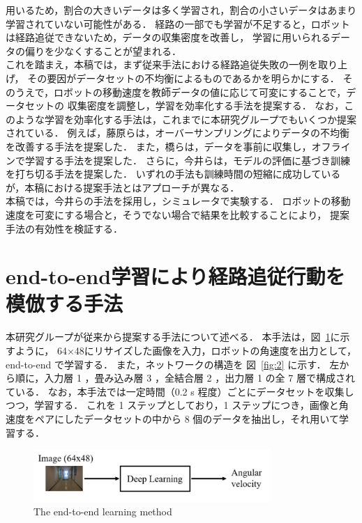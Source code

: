 \documentclass{jarticle}
\renewcommand{\figurename}{図~}
\newcommand{\figref}[1]{\figurename\ref{#1}}
\begin{document}
用いるため，割合の大きいデータは多く学習され，割合の小さいデータはあまり学習されていない可能性がある．
経路の一部でも学習が不足すると，ロボットは経路追従できないため，データの収集密度を改善し，
学習に用いられるデータの偏りを少なくすることが望まれる．\\
\hspace*{1zw}これを踏まえ，本稿では，まず従来手法における経路追従失敗の一例を取り上げ，
その要因がデータセットの不均衡によるものであるかを明らかにする．
そのうえで，ロボットの移動速度を教師データの値に応じて可変にすることで，データセットの
収集密度を調整し，学習を効率化する手法を提案する．
なお，このような学習を効率化する手法は，これまでに本研究グループでもいくつか提案されている．
例えば，藤原らは，オーバーサンプリングによりデータの不均衡を改善する手法を提案した\cite{fuji}．
また，橋らは，データを事前に収集し，オフラインで学習する手法を提案した\cite{takahashi}．
さらに，今井らは，モデルの評価に基づき訓練を打ち切る手法を提案した\cite{imai2}．
いずれの手法も訓練時間の短縮に成功しているが，本稿における提案手法とはアプローチが異なる．\\
\hspace*{1zw}本稿では，今井らの手法を採用し，シミュレータで実験する．
ロボットの移動速度を可変にする場合と，そうでない場合で結果を比較することにより，
提案手法の有効性を検証する．\\


\section{end-to-end学習により経路追従行動を模倣する手法}
本研究グループが従来から提案する手法について述べる．
本手法は，\figref{fig:1}に示すように，
64×48にリサイズした画像を入力，ロボットの角速度を出力として， end-to-end で学習する．
また，ネットワークの構造を \figref{fig:2} に示す．
左から順に，入力層 1 ，畳み込み層 3 ，全結合層 2 ，出力層 1 の全 7 層で構成されている．
なお，本手法では一定時間（0.2 s 程度）ごとにデータセットを収集しつつ，学習する．
これを 1 ステップとしており，1 ステップにつき，画像と角速度をペアにしたデータセットの中から
8 個のデータを抽出し，それ用いて学習する．

\begin{figure}[h!]
  \centering
   \includegraphics[height=20mm]{./pdf/deplearning.pdf}
   \caption{The end-to-end learning method}
   \label{fig:1}
\end{figure}
\end{document}
